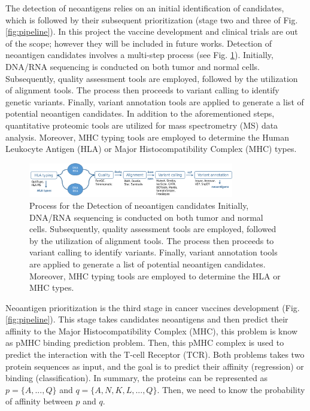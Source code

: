 The detection of neoantigens relies on an initial identification of candidates, which is followed by their subsequent prioritization (stage two and three of Fig. \ref{fig:pipeline}). In this project the vaccine development and clinical trials are out of the scope; however they will be included in future works. Detection of neoantigen candidates involves a multi-step process (see Fig. \ref{fig:neo_detection}). Initially, DNA/RNA sequencing is conducted on both tumor and normal cells. Subsequently, quality assessment tools are employed, followed by the utilization of alignment tools. The process then proceeds to variant calling to identify genetic variants. Finally, variant annotation tools are applied to generate a list of potential neoantigen candidates. In addition to the aforementioned steps, quantitative proteomic tools are utilized for mass spectrometry (MS) data analysis. Moreover, MHC typing tools are employed to determine the Human Leukocyte Antigen (HLA) or Major Histocompatibility Complex (MHC) types.

\begin{figure}[h]
	\centering
	
	\includegraphics[width=0.8\textwidth]{../img/proposal/neo_detection.png}
	
	\caption{Process for the Detection of neoantigen candidates Initially, DNA/RNA sequencing is conducted on both tumor and normal cells. Subsequently, quality assessment tools are employed, followed by the utilization of alignment tools. The process then proceeds to variant calling to identify variants. Finally, variant annotation tools are applied to generate a list of potential neoantigen candidates. Moreover, MHC typing tools are employed to determine the HLA or MHC types.}
	\label{fig:neo_detection}
\end{figure}


Neoantigen prioritization is the third stage in cancer vaccines development (Fig. \ref{fig:pipeline}). This stage takes candidates neoantigens and then predict their affinity to the Major Histocompatibility Complex (MHC), this problem is know as pMHC binding prediction problem. Then,  this pMHC complex is used to predict the interaction with the T-cell Receptor (TCR). Both problems takes two protein sequences as input, and the goal is to predict their affinity (regression) or binding (classification). In summary, the proteins can be represented as $p = \{ A, ... , Q \}$ and  $q = \{ A, N, K, L, ... ,Q \}$. Then, we need to know the probability of affinity between $p$ and $q$. 



